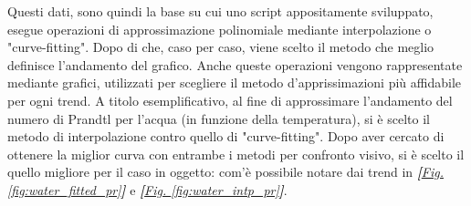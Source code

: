 \documentclass[a4paper,10pt]{article}                                                                                       %
\begin{document}
  Questi dati, sono quindi la base su cui uno script appositamente sviluppato, esegue operazioni di approssimazione
  polinomiale mediante interpolazione o "curve-fitting". Dopo di che, caso per caso, viene scelto il metodo che meglio
  definisce l'andamento del grafico. Anche queste operazioni vengono rappresentate mediante grafici, utilizzati per
  scegliere il metodo d'apprissimazioni più affidabile per ogni trend. A titolo esemplificativo, al fine di approssimare
  l'andamento del numero di Prandtl per l'acqua (in funzione della temperatura), si è scelto il metodo di interpolazione
  contro quello di "curve-fitting". Dopo aver cercato di ottenere la miglior curva con entrambe i metodi per confronto
  visivo, si è scelto il quello migliore per il caso in oggetto: com'è possibile notare dai trend in
  \textit{\textbf{[}\hyperref[fig:water_fitted_pr]{Fig. }\ref{fig:water_fitted_pr}\textbf{]}} e
  \textit{\textbf{[}\hyperref[fig:water_intp_pr]{Fig. }\ref{fig:water_intp_pr}\textbf{]}}.
\end{document}
